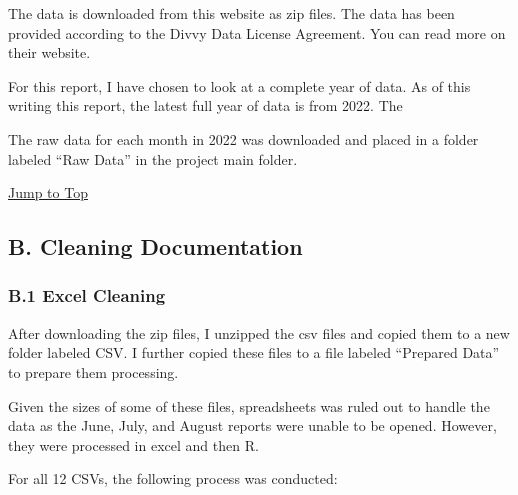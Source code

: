\documentclass[
]{article}
\begin{document}
The data is downloaded from this website as zip files. The data has been
provided according to the Divvy Data License Agreement. You can read
more on their website.

For this report, I have chosen to look at a complete year of data. As of
this writing this report, the latest full year of data is from 2022. The

The raw data for each month in 2022 was downloaded and placed in a
folder labeled ``Raw Data'' in the project main folder.

\protect\hyperlink{toc}{Jump to Top}

\hypertarget{b.-cleaning-documentation}{%
\subsection{B. Cleaning Documentation}\label{b.-cleaning-documentation}}

\hypertarget{b.1-excel-cleaning}{%
\subsubsection{B.1 Excel Cleaning}\label{b.1-excel-cleaning}}

After downloading the zip files, I unzipped the csv files and copied
them to a new folder labeled CSV. I further copied these files to a file
labeled ``Prepared Data'' to prepare them processing.

Given the sizes of some of these files, spreadsheets was ruled out to
handle the data as the June, July, and August reports were unable to be
opened. However, they were processed in excel and then R.

For all 12 CSVs, the following process was conducted:
\end{document}

